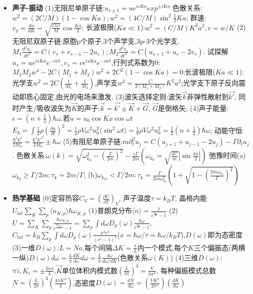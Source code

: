 \documentclass[UTF8,a4paper,1pt,twocolumn]{ctexart}
\begin{document}
\begin{itemize}
  \item \textbf{声子-振动}
  (1)无阻尼单原子链:$u_{s\pm 1}=ue^{isKa}exp^{\pm iKa}$
  色散关系:$w^2=(2C/M)(1-\cos{Ka});w^2=(4C/M)\sin^2{\frac{1}{2}Ka}$;
  群速:$v_{g}=\frac{dw}{dK}=\sqrt{\frac{Ca^2}{M}}\cos{\frac{Ka}{2}}$;
  长波极限($Ka\ll 1$):$w^2=(C/M)K^{2}a^{2},v=w/K$
  (2)无阻尼双原子链:原胞p个原子,3个声学支,3p-3个光学支.$M_1\frac{d^2 u_s}{dt^2}=C(v_s+v_{s-1}-2u_s);M_2\frac{d^2 v_s}{dt^2}=C(u_{s+1}+u_{s}-2v_s)$.
  试探解$u_s=ue^{isKa}e^{-iwt},v_s=ve^{isKa}e^{-iwt}$,行列式系数为0:$M_1 M_2 w^4-2C(M_1+M_2)w^2+2C^2(1-\cos{Ka})=0$;长波极限($Ka\ll 1$):
  光学支$w^2=2C(\frac{1}{M_1}+\frac{1}{M_2})$,声学支$w^2=\frac{C}{2(M_1+M_2)}K^2 a^2$;光学支下原子反向震动即质心固定,由光的电场来激发.
  (3)波矢选择定则:波矢$\vec{k}$非弹性散射到$\vec{k'}$,
  同时产生/吸收波矢为$\vec{K}$的声子:$\vec{k}=\vec{k'}\pm\vec{K}+\vec{G}$,
  $\vec{G}$是倒格矢;
  (4)声子能量:$\epsilon=(n+\frac{1}{2})\hbar\omega$.若$u=u_0\cos{Kx}\cos{\omega t}$
  $E_k=\int\frac{1}{2}\rho(\frac{\partial u}{\partial t})^2=\frac{1}{4}\rho V\omega^2u_0^2\langle\sin^2{\omega t}\rangle=\frac{1}{8}\rho V\omega^2u_0^2=\frac{1}{2}(n+\frac{1}{2})\hbar\omega$;
  动能守恒:$\frac{\hbar^2 k^2}{2M_n}=\frac{\hbar^2 k'^2}{2M_n}\pm\hbar\omega$
  (5)有阻尼单原子链:$m\partial_t^2u_j=C(u_{j+1}+u_{j-1}-2u_j)-\Gamma\partial_tu_j$.
  色散关系:$\omega(k)=\sqrt{\omega_{k_0}^2-(\frac{\Gamma}{2m})^2}-\frac{i\Gamma}{2m}(\omega_{k_0}=\sqrt{\frac{4C}{m}}|\sin{\frac{ka}{2}}|)$
  弛豫时间(a)$\omega_{k_0}\geq\Gamma/2m:\tau_k=2m/\Gamma$;
  (b)$\omega_{k_D}<\Gamma/2m:\tau_k=\frac{\Gamma}{2m\omega_{k_0}^2}(1+\sqrt{1-(\frac{2m\omega_{k_0}}{\Gamma})^2})$

  \item \textbf{热学基础}
  (0)定容热容$C_V=(\frac{\partial U}{\partial T})_V$,
  声子温度$\tau=k_{B}T$,
  晶格内能$U_{lat}\sum_{K}\sum_{p}\langle n_{K,p}\rangle\hbar\omega_{K,p}$
  (1)普朗克分布$\langle n\rangle=\frac{1}{e^{\frac{\hbar\omega}{\tau}}-1}$
  (2)$U=\sum_{K}\sum_{p}\frac{\hbar\omega_{K,p}}{e^{\frac{\hbar\omega_{K,p}}{\tau}}-1}=\sum_{p}\int d\omega D_{p}(\omega)\frac{\hbar\omega}{e^{\frac{\hbar\omega}{\tau}}-1}$,
  $C_{lat}=k_{B}\sum_{p}\int d\omega D_{p}(\omega)\frac{x^2 e^x}{(e^x -1)^2}$($x=\hbar\omega/\tau=\hbar\omega/k_{B}T$),$D(\omega)$即为态密度
  (3)一维$D(\omega)$:$L=Na$,每个间隔$\Delta K=\frac{\pi}{L}$内一个模式,每个$K$三个偏振态(两横一纵)$D(\omega)d\omega=\frac{L}{\pi}\frac{dK}{d\omega}d\omega
  =\frac{L}{\pi}\frac{d\omega}{d\omega/dK}$(色散关系$\omega(K)$)
  (4)三维$D(\omega)$:$\forall i, K_{i}=\pm\frac{2n\pi}{L}$,$\vec{K}$单位体积内模式数$(\frac{L}{2\pi})^3=\frac{V}{8\pi^3}$,
  每种偏振模式总数$N=(\frac{L}{2\pi})^3(\frac{4\pi K^3}{3})$,态密度$D(\omega)=\frac{dN}{d\omega}=(\frac{VK^2}{2\pi^2})(\frac{dK}{d\omega})$
  

\end{itemize}
\end{document}
